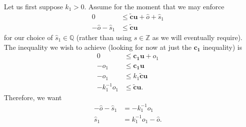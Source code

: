 \documentclass[11pt]{article}
\newcommand{\vect}[1]{\mathbf{#1}}
\begin{document}
Let us first suppose $k_1 > 0$. Assume for the moment that we may enforce
\begin{align*}
0 &\leq \widetilde{\vect{c}}\vect{u} + \widehat{o} + \widehat{s}_1 \\
-\widehat{o} - \widehat{s}_1 &\leq \widetilde{\vect{c}}\vect{u}
\end{align*}
for our choice of $\widehat{s}_1 \in \mathbb{Q}$ (rather than using $s\in \mathbb{Z}$ as we will eventually require). The inequality we wish to achieve (looking for now at just the $\vect{c_1}$ inequality) is
\begin{align*}
0 &\leq \vect{c_1}\vect{u} + o_1 \\
-o_1 &\leq \vect{c_1}\vect{u} \\
-o_1 &\leq k_1\widetilde{\vect{c}}\vect{u} \\
-k_1^{-1}o_1 &\leq \widetilde{\vect{c}}\vect{u}.
\end{align*}
Therefore, we want
\begin{align*}
-\widehat{o} - \widehat{s}_1 &= -k_1^{-1}o_1 \\
\widehat{s}_1 &= k_1^{-1}o_1 - \widehat{o}.
\end{align*}
\end{document}
